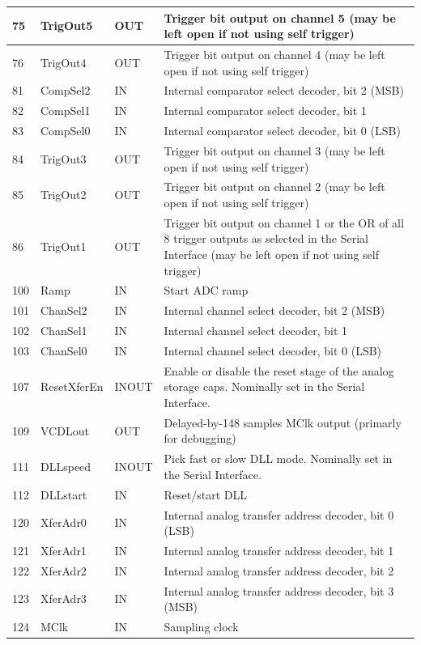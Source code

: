 \documentclass[12pt]{article}
\begin{document}
\begin{center}
\begin{longtable}[h!]{|l|l|l| p{11cm}|}
   75 & TrigOut5 & OUT & Trigger bit output on channel 5 (may be left open if not using self trigger)\\ \hline
   76 & TrigOut4 & OUT & Trigger bit output on channel 4 (may be left open if not using self trigger)\\ \hline
   81 & CompSel2 & IN & Internal comparator select decoder, bit 2 (MSB) \\ \hline
   82 & CompSel1 & IN & Internal comparator select decoder, bit 1 \\ \hline
   83 & CompSel0 & IN & Internal comparator select decoder, bit 0 (LSB)\\ \hline  
   84 & TrigOut3 & OUT & Trigger bit output on channel 3 (may be left open if not using self trigger)\\ \hline
   85 & TrigOut2 & OUT & Trigger bit output on channel 2 (may be left open if not using self trigger)\\ \hline
   86 & TrigOut1 & OUT & Trigger bit output on channel 1 or the OR of all 8 trigger outputs as selected in the Serial Interface (may be left open if not using self trigger)\\ \hline
   100 & Ramp & IN & Start ADC ramp \\ \hline
   101 & ChanSel2 & IN & Internal channel select decoder, bit 2 (MSB) \\ \hline
   102 & ChanSel1 & IN & Internal channel select decoder, bit 1 \\ \hline
   103 & ChanSel0 & IN & Internal channel select decoder, bit 0 (LSB)\\ \hline
   107 & ResetXferEn & INOUT & Enable or disable the reset stage of the analog storage caps. Nominally set in the Serial Interface. \\ \hline
   109 & VCDLout & OUT & Delayed-by-148 samples MClk output (primarly for debugging) \\ \hline
   111 & DLLspeed & INOUT & Pick fast or slow DLL mode. Nominally set in the Serial Interface. \\ \hline
   112 & DLLstart & IN & Reset/start DLL \\ \hline
   120 & XferAdr0 & IN & Internal analog transfer address decoder, bit 0 (LSB)\\ \hline
   121 & XferAdr1 & IN & Internal analog transfer address decoder, bit 1 \\ \hline
   122 & XferAdr2 & IN & Internal analog transfer address decoder, bit 2 \\ \hline
   123 & XferAdr3 & IN & Internal analog transfer address decoder, bit 3 (MSB)\\ \hline
   124 & MClk & IN & Sampling clock \\ \hline
   
\end{longtable}
\end{center}
\end{document}

